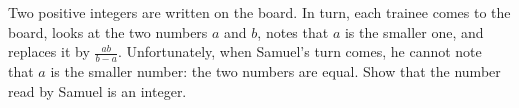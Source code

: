 Two positive integers are written on the board. In turn, each trainee comes to the board, looks at the two numbers $a$ and $b$, notes that $a$ is the smaller one, and replaces it by $\frac{ab}{b-a}$. Unfortunately, when Samuel's turn comes, he cannot note that $a$ is the smaller number: the two numbers are equal. Show that the number read by Samuel is an integer.
